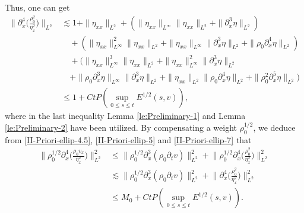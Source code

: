 \documentclass[11pt, reqno]{amsart}
\numberwithin{equation}{section}
\begin{document}
{Thus, one can get
\begin{equation}\label{II-Priori-ellip-7}
\begin{aligned}
\bigg\|\partial_x^4\bigg({\frac{\rho_0^2}{\eta_x^2}}\bigg)\bigg\|_{L^2}
&\lesssim 1+\|\eta_{xx}\|_{L^2}+(\|\eta_{xx}\|_{L^\infty}\|\eta_{xx}\|_{L^2}+\|\partial_x^3\eta\|_{L^2})\\
&\quad+(\|\eta_{xx}\|_{L^\infty}^2\|\eta_{xx}\|_{L^2}
+\|\eta_{xx}\|_{L^\infty}\|\partial_x^3\eta\|_{L^2}
+\|\rho_0\partial_x^4\eta\|_{L^2})\\
&\quad+(\|\eta_{xx}\|_{L^\infty}^3\|\eta_{xx}\|_{L^2}
+\|\eta_{xx}\|_{L^\infty}^2\|\partial_x^3\eta\|_{L^2}\\
&\quad+\|\rho_0\partial_x^3\eta\|_{L^\infty}\|\partial_x^3\eta\|_{L^2}
+\|\eta_{xx}\|_{L^2}\|\rho_0\partial_x^4\eta\|_{L^2}
+\|\rho_0^2\partial_x^5\eta\|_{L^2})\\
&\leq 1+Ct P(\sup_{0\leq s\leq t}E^{1/2}(s,v)),
\end{aligned}
\end{equation}
where in the last inequality Lemma \ref{le:Preliminary-1} and Lemma \ref{le:Preliminary-2} have been utilized.
By compensating a weight \(\rho_0^{1/2}\), we deduce from \eqref{II-Priori-ellip-4.5}, \eqref{II-Priori-ellip-5} and \eqref{II-Priori-ellip-7} that
\begin{equation}\label{II-Priori-ellip-8}
\begin{aligned}
\bigg\|\rho_0^{1/2}\partial_x^4\bigg({\frac{\rho_0v_x}{\eta_x^2}}\bigg)\bigg\|_{L^2}^2
&\leq \|\rho_0^{1/2}\partial_x^3(\rho_0\partial_tv)\|_{L^2}^2
+\bigg\|\rho_0^{1/2}\partial_x^4\bigg(\frac{\rho_0^2}{\eta_x^2}\bigg)\bigg\|_{L^2}^2\\
&\lesssim \|\rho_0^{1/2}\partial_x^3(\rho_0\partial_tv)\|_{L^2}^2
+\bigg\|\partial_x^4\bigg(\frac{\rho_0^2}{\eta_x^2}\bigg)\bigg\|_{L^2}^2\\
&\leq M_0+Ct P(\sup_{0\leq s\leq t}E^{1/2}(s,v)).
\end{aligned}
\end{equation}

}
\end{document}
